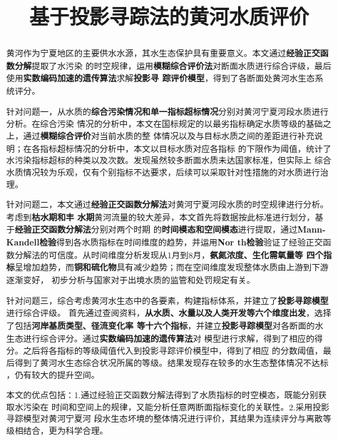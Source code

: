 \documentclass{whutmod}
\title{基于投影寻踪法的黄河水质评价}
\begin{document}
\begin{spacing}{1.2}


\maketitle

\begin{abstract}\setlength{\parskip}{0.3\baselineskip}
	黄河作为宁夏地区的主要供水水源，其水生态保护具有重要意义。本文通过\textbf{经验正交函数分解}提取了水污染
	的时空规律，运用\textbf{模糊综合评价法}对断面水质进行综合评级，最后使用\textbf{实数编码加速的遗传算法}求解\textbf{投影寻
	踪评价模型}，得到了各断面处黄河水生态系统评分。

	针对问题一，从水质的\textbf{综合污染情况和单一指标超标情况}分别对黄河宁夏河段水质进行分析。在综合污染
	情况的分析中，本文在国标规定的以最劣指标确定水质等级的基础之上，通过\textbf{模糊综合评价}对当前水质的整
	体情况以及与目标水质之间的差距进行补充说明；在各指标超标情况的分析中，本文以目标水质对应各指标
	的下限作为阈值，统计了水污染指标超标的种类以及次数。发现虽然较多断面水质未达国家标准，但实际上
	综合水质情况较为乐观，仅有个别指标不达要求，后续可以采取针对性措施的对水质进行治理。
	
	针对问题二，本文通过\textbf{经验正交函数分解法}对黄河宁夏河段水质的时空规律进行分析。考虑到\textbf{枯水期和丰
	水期}黄河流量的较大差异，本文首先将数据按此标准进行划分，基于\textbf{经验正交函数分解法}分别对两个时期
	的\textbf{时间模态和空间模态}进行提取，通过\textbf{Mann-Kandell检验}得到各水质指标在时间维度的趋势，并运用\textbf{Nor
	th检验}验证了经验正交函数分解法的可信度。从时间维度分析发现从1月到8月，\textbf{氨氮浓度、生化需氧量等
	四个指标}呈增加趋势，而\textbf{铜和硫化物}具有减少趋势；而在空间维度发现整体水质由上游到下游逐渐变好，
	初步分析与国家对于出境水质的监管和处罚规定有关。
	
	针对问题三，综合考虑黄河水生态中的各要素，构建指标体系，并建立了\textbf{投影寻踪模型}进行综合评级。
	首先通过查阅资料，\textbf{从水质、水量以及人类开发等六个维度出发}，选择了包括\textbf{河岸基质类型、径流变化率
	等十六个指标}，并建立\textbf{投影寻踪模型}对各断面的水生态进行综合评分。通过\textbf{实数编码加速的遗传算法}对
	模型进行求解，得到了相应的得分。之后将各指标的等级阈值代入到投影寻踪评价模型中，得到了相应
	的分数阈值，最后得到了黄河水生态综合状况所属的等级。结果发现存在较多的水生态整体情况不达标
	，仍有较大的提升空间。
	
	本文的优点包括：1.通过经验正交函数分解法得到了水质指标的时空模态，既能分别获取水污染在
	时间和空间上的规律，又能分析任意两断面指标变化的关联性。2.采用投影寻踪模型对黄河宁夏河
	段水生态坏境的整体情况进行评价，其结果为连续评分与离散等级相结合，更为科学合理。


\end{abstract}
\end{spacing}
\end{document}
